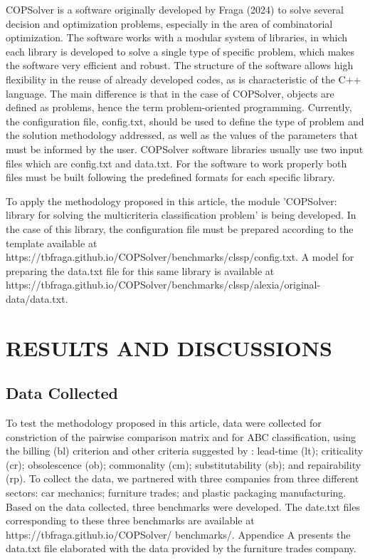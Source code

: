 \documentclass[10pt,fleqn,a4paper,twoside]{article}
\begin{document}
	COPSolver is a software originally developed by Fraga (2024) to solve several decision and optimization problems, especially in the area of combinatorial optimization. The software works with a modular system of libraries, in which each library is developed to solve a single type of specific problem, which makes the software very efficient and robust. The structure of the software allows high flexibility in the reuse of already developed codes, as is characteristic of the C++ language. The main difference is that in the case of COPSolver, objects are defined as problems, hence the term problem-oriented programming. Currently, the configuration file, config.txt, should be used to define the type of problem and the solution methodology addressed, as well as the values of the parameters that must be informed by the user. COPSolver software libraries usually use two input files which are config.txt and data.txt. For the software to work properly both files must be built following the predefined formats for each specific library.  
	
	To apply the methodology proposed in this article, the module 'COPSolver: library for solving the multicriteria classification problem' is being developed. In the case of this library, the configuration file must be prepared according to the template available at https://tbfraga.github.io/COPSolver/benchmarks/clssp/config.txt. A model for preparing the data.txt file for this same library is available at https://tbfraga.github.io/COPSolver/benchmarks/clssp/alexia/original-data/data.txt.
	
	\section{RESULTS AND DISCUSSIONS}
    
    \subsection{Data Collected}
    
    To test the methodology proposed in this article, data were collected for constriction of the pairwise comparison matrix and for ABC classification, using the billing (bl) criterion and other criteria suggested by \cite{FloresWhybark1986}: lead-time (lt); criticality (cr); obsolescence (ob); commonality (cm); substitutability (sb); and repairability (rp). To collect the data, we partnered with three companies from three different sectors: car mechanics; furniture trades; and plastic packaging manufacturing. Based on the data collected, three benchmarks were developed. The date.txt files corresponding to these three benchmarks are available at https://tbfraga.github.io/COPSolver/ benchmarks/. Appendice A presents the data.txt file elaborated with the data provided by the furniture trades company.
    
\end{document}
